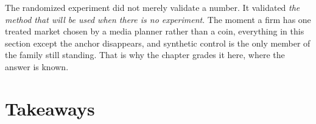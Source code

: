 \begin{remark}
The randomized experiment did not merely validate a number. It validated \emph{the method that
will be used when there is no experiment}. The moment a firm has one treated market chosen by a
media planner rather than a coin, everything in this section except the anchor disappears, and
synthetic control is the only member of the family still standing. That is why the chapter grades
it here, where the answer is known.
\end{remark}

\section{Takeaways}
\label{sec:sc:take}

